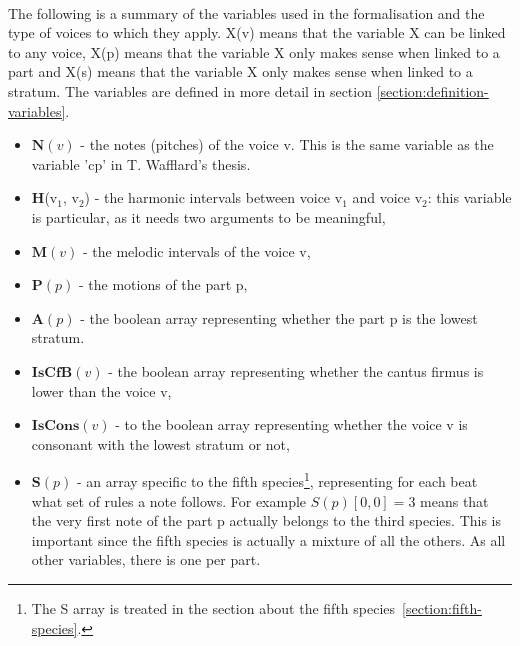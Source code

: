 \paragraph{}
The following is a summary of the variables used in the formalisation and the type of voices to which they apply. X(v) means that the variable X can be linked to any voice, X(p) means that the variable X only makes sense when linked to a part and X(s) means that the variable X only makes sense when linked to a stratum. The variables are defined in more detail in section \ref{section:definition-variables}.
\begin{itemize}
    \item $\textbf{N}(v)$ - the notes (pitches) of the voice v. This is the same variable as the variable 'cp' in T. Wafflard's thesis.
    \item \textbf{H}(v$_1$, v$_2$) - the harmonic intervals between voice v$_1$ and voice v$_2$: this variable is particular, as it needs two arguments to be meaningful,
    \item $\textbf{M}(v)$ - the melodic intervals of the voice v, 
    \item $\textbf{P}(p)$ - the motions of the part p,
    \item $\textbf{A}(p)$ - the boolean array representing whether the part p is the lowest stratum.
    \item $\textbf{IsCfB}(v)$ - the boolean array representing whether the cantus firmus is lower than the voice v,
    \item $\textbf{IsCons}(v)$ - to the boolean array representing whether the voice v is consonant with the lowest stratum or not,
    \item $\textbf{S}(p)$ - an array specific to the fifth species\footnote{The S array is treated in the section about the fifth species~\ref{section:fifth-species}.}, representing for each beat what set of rules a note follows. For example $S(p)[0, 0]=3$ means that the very first note of the part p actually belongs to the third species. This is important since the fifth species is actually a mixture of all the others. As all other variables, there is one per part.
\end{itemize}

